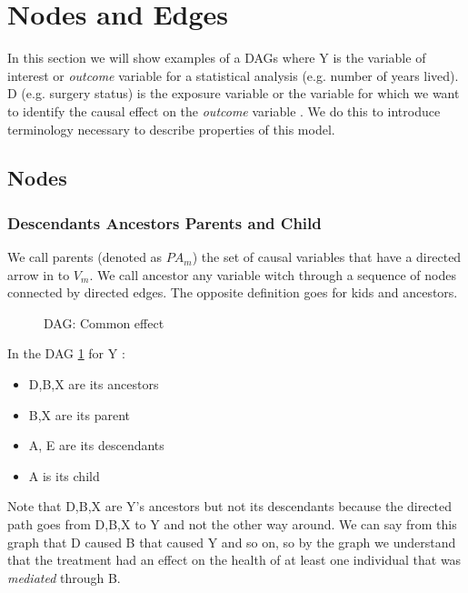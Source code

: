 \section{Nodes and Edges}
In this section we will show examples of a DAGs where Y is the variable of interest or \textit{outcome} variable for a statistical analysis (e.g. number of years lived). D (e.g. surgery status) is the exposure variable or the variable for which we want to identify the causal effect on the \textit{outcome} variable . We do this to introduce terminology necessary to describe properties of this model.
\subsection{Nodes}

\subsubsection{Descendants Ancestors Parents and Child}
We call parents (denoted as $PA_m$) the set of causal variables that have a directed arrow in to $V_m$. We call ancestor any variable witch through a sequence of nodes connected by directed edges. The opposite definition goes for kids and ancestors. 

\begin{figure}[H]
\centering    
\caption{DAG: Common effect}
\label{DAG:term}
\end{figure}

In the DAG \ref{DAG:term} for Y : 
\begin{itemize}
\item {D,B,X} are its ancestors
\item {B,X} are its parent
\item {A, E} are its descendants
\item {A} is its child
\end{itemize}
Note that {D,B,X} are Y's ancestors but not its descendants because the directed path goes from {D,B,X} to Y and not the other way around. 
We can say from this graph that D caused B that caused Y and so on, so by the graph we understand that the treatment had an effect on the health of at least one individual that was \textit{mediated} through B.
